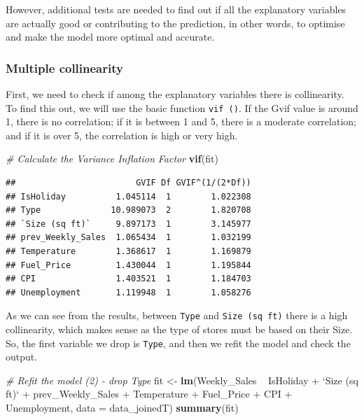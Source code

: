 \documentclass[11pt,]{article}
\newenvironment{Shaded}{\begin{snugshade}}{\end{snugshade}}
\newcommand{\KeywordTok}[1]{\textcolor[rgb]{0.13,0.29,0.53}{\textbf{{#1}}}}
\newcommand{\DataTypeTok}[1]{\textcolor[rgb]{0.13,0.29,0.53}{{#1}}}
\newcommand{\StringTok}[1]{\textcolor[rgb]{0.31,0.60,0.02}{{#1}}}
\newcommand{\CommentTok}[1]{\textcolor[rgb]{0.56,0.35,0.01}{\textit{{#1}}}}
\newcommand{\NormalTok}[1]{{#1}}
\begin{document}
However, additional tests are needed to find out if all the explanatory
variables are actually good or contributing to the prediction, in other
words, to optimise and make the model more optimal and accurate.

\subsubsection{Multiple collinearity}\label{multiple-collinearity}

First, we need to check if among the explanatory variables there is
collinearity. To find this out, we will use the basic function
\texttt{vif\ ()}. If the Gvif value is around 1, there is no
correlation; if it is between 1 and 5, there is a moderate correlation;
and if it is over 5, the correlation is high or very high.

\begin{Shaded}
\begin{Highlighting}[]
\CommentTok{# Calculate the Variance Inflation Factor}
\KeywordTok{vif}\NormalTok{(fit)}
\end{Highlighting}
\end{Shaded}

\begin{verbatim}
##                        GVIF Df GVIF^(1/(2*Df))
## IsHoliday          1.045114  1        1.022308
## Type              10.989073  2        1.820708
## `Size (sq ft)`     9.897173  1        3.145977
## prev_Weekly_Sales  1.065434  1        1.032199
## Temperature        1.368617  1        1.169879
## Fuel_Price         1.430044  1        1.195844
## CPI                1.403521  1        1.184703
## Unemployment       1.119948  1        1.058276
\end{verbatim}

As we can see from the results, between \texttt{Type} and
\texttt{Size\ (sq\ ft)} there is a high collinearity, which makes sense
as the type of stores must be based on their Size. So, the first
variable we drop is \texttt{Type}, and then we refit the model and check
the output.

\begin{Shaded}
\begin{Highlighting}[]
\CommentTok{# Refit the model (2) - drop Type}
\NormalTok{fit <-}\StringTok{ }\KeywordTok{lm}\NormalTok{(Weekly_Sales ~}\StringTok{ }\NormalTok{IsHoliday +}\StringTok{ `}\DataTypeTok{Size (sq ft)}\StringTok{`} \NormalTok{+}\StringTok{ }\NormalTok{prev_Weekly_Sales +}\StringTok{ }
\StringTok{    }\NormalTok{Temperature +}\StringTok{ }\NormalTok{Fuel_Price +}\StringTok{ }\NormalTok{CPI +}\StringTok{ }\NormalTok{Unemployment, }\DataTypeTok{data =} \NormalTok{data_joinedT)}
\KeywordTok{summary}\NormalTok{(fit)}
\end{Highlighting}
\end{Shaded}
\end{document}
